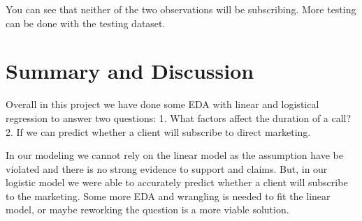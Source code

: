 \documentclass[
]{article}
\begin{document}
You can see that neither of the two observations will be subscribing.
More testing can be done with the testing dataset.

\section{Summary and Discussion}\label{summary-and-discussion}

Overall in this project we have done some EDA with linear and logistical
regression to answer two questions: 1. What factors affect the duration
of a call? 2. If we can predict whether a client will subscribe to
direct marketing.

In our modeling we cannot rely on the linear model as the assumption
have be violated and there is no strong evidence to support and claims.
But, in our logistic model we were able to accurately predict whether a
client will subscribe to the marketing. Some more EDA and wrangling is
needed to fit the linear model, or maybe reworking the question is a
more viable solution.
\end{document}

